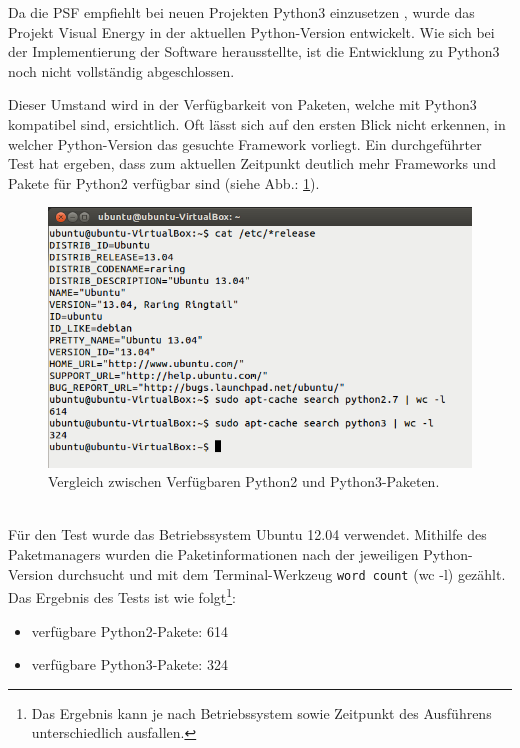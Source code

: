 \documentclass[Bachelorarbeit.tex]{subfiles}
\begin{document}

Da die \acs{PSF} empfiehlt bei neuen Projekten Python3 einzusetzen \parencite[vgl.][]{python2_or_python3}, wurde das Projekt Visual Energy in der aktuellen Python-Version entwickelt.
Wie sich bei der Implementierung der Software herausstellte, ist die Entwicklung zu Python3 noch nicht vollständig abgeschlossen.

Dieser Umstand wird in der Verfügbarkeit von Paketen, welche mit Python3 kompatibel sind, ersichtlich.
Oft lässt sich auf den ersten Blick nicht erkennen, in welcher Python-Version das gesuchte Framework vorliegt. 
Ein durchgeführter Test hat ergeben, dass zum aktuellen Zeitpunkt deutlich mehr Frameworks und Pakete für Python2 verfügbar sind (siehe Abb.: \ref{fig:PaketVergleich_Python_Version}). 
\begin{figure}[h]
\centering
\includegraphics[width=0.7\linewidth]{./img/PaketVergleich_Python_Version}
\caption{Vergleich zwischen Verfügbaren Python2 und Python3-Paketen.}
\label{fig:PaketVergleich_Python_Version}
\end{figure}
\newpage
\mbox{}\\
Für den Test wurde das Betriebssystem Ubuntu 12.04 verwendet.
 Mithilfe des Paketmanagers wurden die Paketinformationen nach der jeweiligen Python-Version durchsucht und mit dem Terminal-Werkzeug \texttt{word count} (wc -l) gezählt. 
 Das Ergebnis des Tests ist wie folgt\footnote{Das Ergebnis kann je nach Betriebssystem sowie Zeitpunkt des Ausführens unterschiedlich ausfallen.}:
 \begin{itemize}
 \item verfügbare Python2-Pakete: 614
 \item verfügbare Python3-Pakete: 324
 \end{itemize}
\end{document}
